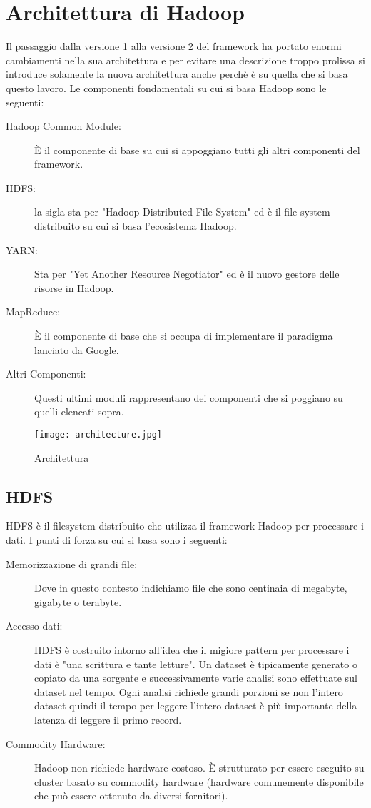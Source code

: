 \section{Architettura di Hadoop}
Il passaggio dalla versione 1 alla versione 2 del framework ha portato enormi cambiamenti nella sua architettura e per evitare una descrizione troppo prolissa si introduce solamente la nuova architettura anche perchè è su quella che si basa questo lavoro. Le componenti fondamentali su cui si basa Hadoop sono le seguenti:
\begin{description}
  \item[Hadoop Common Module:] È il componente di base su cui si appoggiano tutti gli altri componenti del framework.
  \item[HDFS:] la sigla sta per "Hadoop Distributed File System" ed è il file system distribuito su cui si basa l'ecosistema Hadoop.
  \item[YARN:] Sta per "Yet Another Resource Negotiator" ed è il nuovo gestore delle risorse in Hadoop.
  \item[MapReduce:] È il componente di base che si occupa di implementare il paradigma lanciato da Google.
  \item[Altri Componenti:] Questi ultimi moduli rappresentano dei componenti che si poggiano su quelli elencati sopra.
\end{description}
\begin{figure}
  \begin{center}
    \texttt{[image: architecture.jpg]}
    \caption{Architettura}
    \label{fig:architecture}
  \end{center}
\end{figure}
\subsection{HDFS}
HDFS è il filesystem distribuito che utilizza il framework Hadoop per processare i dati. I punti di forza su cui si basa sono i seguenti:
\begin{description}
  \item[Memorizzazione di grandi file:] Dove in questo contesto indichiamo file che sono centinaia di megabyte, gigabyte o terabyte.
  \item[Accesso dati:] HDFS è costruito intorno all'idea che il migiore pattern per processare i dati è "una scrittura e tante letture". Un dataset è tipicamente generato o copiato da una sorgente e successivamente varie analisi sono effettuate sul dataset nel tempo. Ogni analisi richiede grandi porzioni se non l'intero dataset quindi il tempo per leggere l'intero dataset è più importante della latenza di leggere il primo record.
  \item[Commodity Hardware:]Hadoop non richiede hardware costoso. È strutturato per essere eseguito su cluster basato su commodity hardware (hardware comunemente disponibile che può essere ottenuto da diversi fornitori).
\end{description}
